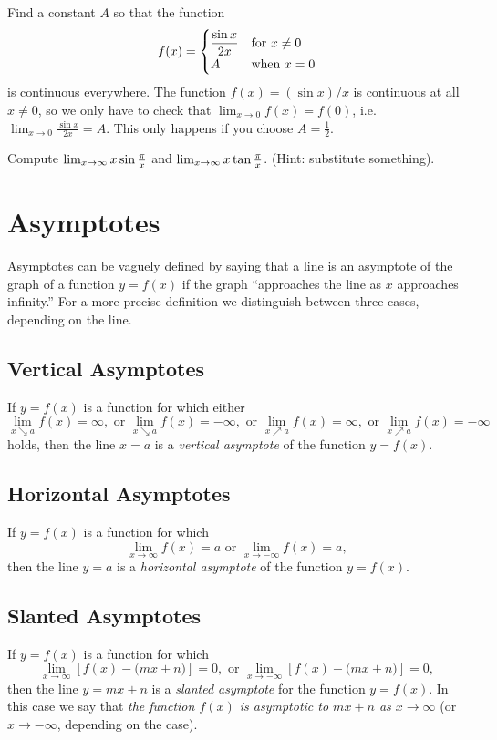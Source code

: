 \begin{multicols}{2}
\problem Find a constant \(A\) so that the function 
\[
f(x) =
\begin{cases}
  \dfrac{\sin x}{2x} &\hbox{for $x\ne0$} \\
  A & \hbox{when \(x=0\)}
\end{cases}
\]
  is continuous everywhere.
\answer 
The function \(f(x) = (\sin x)/x\) is continuous at all \(x\ne 0\),
so we only have to check that \(\lim_{x\to0} f(x) = f(0)\), i.e.\
\(\lim_{x\to0}\frac{\sin x}{2x} = A\).  This only happens if you
choose \(A=\frac12\).
\endanswer

\problem Compute $\lim_{x\to\infty}x\sin\frac \pi x$ and $\lim_{x\to\infty}x 
\tan\frac\pi x$. (Hint: substitute something).


\end{multicols}
\noproblemfont


\section{Asymptotes} 
\label{sec:asymptotes}
Asymptotes can be vaguely defined by saying that a line is an
asymptote of the graph of a function $y=f(x)$ if the graph ``approaches the line
as $x$ approaches infinity.'' For a more precise definition we distinguish
between three cases, depending on the line.

\subsection{Vertical Asymptotes} 
If $y=f(x)$ is a function for which either
\[
\lim_{x\searrow a} f(x) = \infty,
\text{ or }
\lim_{x\searrow a} f(x) = -\infty,
\text{ or }
\lim_{x\nearrow a} f(x) = \infty,
\text{ or }
\lim_{x\nearrow a} f(x) = -\infty
\]
holds, then the line $x=a$ is a \emph{vertical asymptote} of the function $y=f(x)$.

\subsection{Horizontal Asymptotes} 
If $y=f(x)$ is a function for which
\[
\lim_{x\to \infty} f(x) = a \text{ or }
\lim_{x\to-\infty} f(x) = a,
\]then the line $y=a$ is a \emph{horizontal asymptote} of the function
$y=f(x)$.

\subsection{Slanted Asymptotes} 
\label{sec:03slanted-asymptotes}
If $y=f(x)$ is a function for which
\[
\lim_{x\to\infty} \left[ f(x) - \bigl(mx+n\bigr)\right] =0,\text{ or }
\lim_{x\to-\infty} \left[ f(x) - \bigl(mx+n\bigr)\right] =0,
\]
then the line $y=mx+n$ is a \emph{slanted asymptote} for the function
$y=f(x)$.
In this case we say that \emph{the function $f(x)$ is asymptotic to
$mx+n$ as $x\to\infty$} (or $x\to-\infty$, depending on the case).

